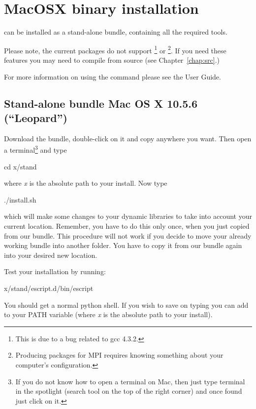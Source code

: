 
%
%
%

\section{MacOSX binary installation}
\label{sec:binmac}

\esfinley can be installed as a stand-alone bundle, containing all the required tools.

Please note, the current packages do not support \openmp\footnote{This is due to a bug related to gcc 4.3.2.} or \mpi\footnote{Producing packages for MPI requires knowing something about your computer's configuration.}.
If you need these features you may need to compile \esfinley from source (see Chapter~\ref{chap:src}.)

For more information on using the  command please see the User Guide.

\subsection{Stand-alone bundle Mac OS X 10.5.6 (``Leopard'')}

Download the bundle, double-click on it and copy   anywhere you want.
Then open a terminal\footnote{If you do not know how to open a terminal on Mac, then just type terminal in the spotlight (search tool on the top of the right corner) and once found just click on it.} and type
\begin{shellCode}
cd x/stand 
\end{shellCode}
where \textit{x} is the absolute path to your install. 
Now type
\begin{shellCode}
./install.sh 
\end{shellCode}
which will make some changes to your dynamic libraries to take into account your current location. Remember, you have  to do this only once, when you just copied from our bundle. This procedure will not work if you decide to move your already working bundle into another folder. You have to copy it from our bundle again into your desired new location.

Test your installation by running:
\begin{shellCode}
 x/stand/escript.d/bin/escript
\end{shellCode}
You should get a normal python shell.
If you wish to save on typing you can add  to your PATH variable (where \textit{x} is the absolute path to your install). 

